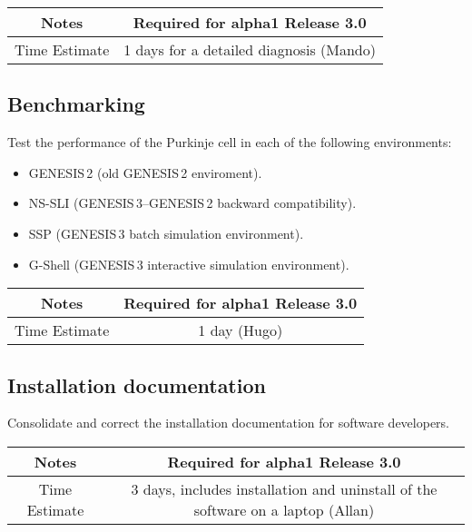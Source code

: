 \documentclass[12pt]{article}
\begin{document}
{
  \vspace{5mm}
  \centering
  \begin{tabular}{|c|c|}
    \hline
    Notes
    & Required for alpha1 Release 3.0 \\
    \hline
    Time Estimate
    & 1 days for a detailed diagnosis (Mando) \\
    \hline
  \end{tabular}
}



\subsection{Benchmarking}

Test the performance of the Purkinje cell in each of the following
environments:

\begin{itemize}
\item GENESIS\,2 (old GENESIS\,2 enviroment).
\item NS-SLI (GENESIS\,3--GENESIS\,2 backward compatibility).
\item SSP (GENESIS\,3 batch simulation environment).
\item G-Shell (GENESIS\,3 interactive simulation environment).
\end{itemize}

{
  \vspace{5mm}
  \centering
  \begin{tabular}{|c|c|}
    \hline
    Notes
    & Required for alpha1 Release 3.0 \\
    \hline
    Time Estimate
    & 1 day (Hugo) \\
    \hline
  \end{tabular}
}



\subsection{Installation documentation}

Consolidate and correct the installation documentation for software
developers.

{
  \vspace{5mm}
  \centering
  \begin{tabular}{|c|c|}
    \hline
    Notes
    & Required for alpha1 Release 3.0 \\
    \hline
    Time Estimate
    & 3 days, includes installation and uninstall of the software on a laptop (Allan) \\
    \hline
  \end{tabular}
}
\end{document}
